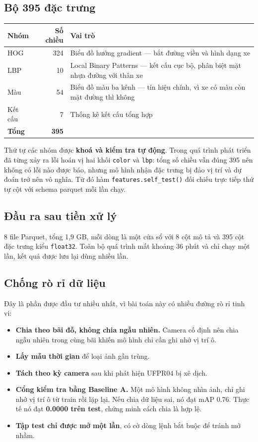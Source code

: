\documentclass[12pt]{ai_conquer2026}
\begin{document}
\subsection{Bộ 395 đặc trưng}

\begin{center}
\begin{tabular}{|l|r|p{7.5cm}|}
\hline
\textbf{Nhóm} & \textbf{Số chiều} & \textbf{Vai trò} \\
\hline
HOG & 324 & Biểu đồ hướng gradient --- bắt đường viền và hình dạng xe \\
LBP & 10 & Local Binary Patterns --- kết cấu cục bộ, phân biệt mặt nhựa đường với thân xe \\
Màu & 54 & Biểu đồ màu ba kênh --- tín hiệu chính, vì xe có màu còn mặt đường thì không \\
Kết cấu & 7 & Thống kê kết cấu tổng hợp \\
\hline
\textbf{Tổng} & \textbf{395} & \\
\hline
\end{tabular}
\end{center}

Thứ tự các nhóm được \textbf{khoá và kiểm tra tự động}. Trong quá trình phát triển đã từng xảy ra lỗi hoán vị hai khối \texttt{color} và \texttt{lbp}: tổng số chiều vẫn đúng 395 nên không có lỗi nào được báo, nhưng mô hình nhận đặc trưng bị đảo vị trí và dự đoán trở nên vô nghĩa. Từ đó hàm \texttt{features.self\_test()} đối chiếu trực tiếp thứ tự cột với schema parquet mỗi lần chạy.

\subsection{Đầu ra sau tiền xử lý}

8 file Parquet, tổng 1,9 GB, mỗi dòng là một cửa sổ với 8 cột mô tả và 395 cột đặc trưng kiểu \texttt{float32}. Toàn bộ quá trình mất khoảng 36 phút và chỉ chạy một lần, kết quả được lưu lại dùng nhiều lần.

\subsection{Chống rò rỉ dữ liệu}

Đây là phần được đầu tư nhiều nhất, vì bài toán này có nhiều đường rò rỉ tinh vi:

\begin{itemize}
\item \textbf{Chia theo bãi đỗ, không chia ngẫu nhiên.} Camera cố định nên chia ngẫu nhiên trong cùng bãi khiến mô hình chỉ cần ghi nhớ vị trí ô.
\item \textbf{Lấy mẫu thời gian} để loại ảnh gần trùng.
\item \textbf{Tách theo kỳ camera} sau khi phát hiện UFPR04 bị xê dịch.
\item \textbf{Cổng kiểm tra bằng Baseline A.} Một mô hình không nhìn ảnh, chỉ ghi nhớ vị trí ô từ train rồi lặp lại. Nếu chia dữ liệu sai, nó đạt mAP 0.76. Thực tế nó đạt \textbf{0.0000 trên test}, chứng minh cách chia là hợp lệ.
\item \textbf{Tập test chỉ được mở một lần}, có cờ dòng lệnh bắt buộc để tránh mở nhầm.
\end{itemize}
\end{document}
